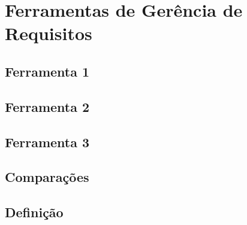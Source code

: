 
\chapter[Ferramentas de Gerência de Requisitos]{Ferramentas de Gerência de Requisitos}
\section{Ferramenta 1}
\section{Ferramenta 2}
\section{Ferramenta 3}
\section{Comparações}
\section{Definição}
